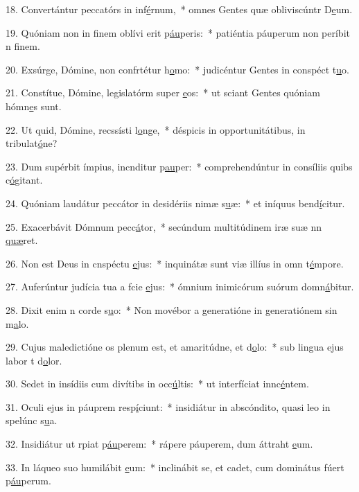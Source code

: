 18. Convertántur peccatórs in inf\uline{é}rnum,~* omnes Gentes quæ obliviscúntr D\uline{e}um.\par 
19. Quóniam non in finem oblívi erit p\uline{áu}peris:~* patiéntia páuperum non períbit n f\uline{i}nem.\par 
20. Exsúrge, Dómine, non confrtétur h\uline{o}mo:~* judicéntur Gentes in conspéct t\uline{u}o.\par 
21. Constítue, Dómine, legislatórm super \uline{e}os:~* ut sciant Gentes quóniam hómn\uline{e}s sunt.\par 
22. Ut quid, Dómine, recssísti l\uline{o}nge,~* déspicis in opportunitátibus, in tribulat\uline{ó}ne?\par 
23. Dum supérbit ímpius, incnditur p\uline{au}per:~* comprehendúntur in consíliis quibs c\uline{ó}gitant.\par 
24. Quóniam laudátur peccátor in desidériis nimæ s\uline{u}æ:~* et iníquus bend\uline{í}citur.\par 
25. Exacerbávit Dómnum pecc\uline{á}tor,~* secúndum multitúdinem iræ suæ nn \uline{quæ}ret.\par 
26. Non est Deus in cnspéctu \uline{e}jus:~* inquinátæ sunt viæ illíus in omn t\uline{é}mpore.\par 
27. Auferúntur judícia tua a fcie \uline{e}jus:~* ómnium inimicórum suórum domn\uline{á}bitur.\par 
28. Dixit enim n corde s\uline{u}o:~* Non movébor a generatióne in generatiónem sin m\uline{a}lo.\par 
29. Cujus maledictióne os plenum est, et amaritúdne, et d\uline{o}lo:~* sub lingua ejus labor t d\uline{o}lor.\par 
30. Sedet in insídiis cum divítibs in occ\uline{ú}ltis:~* ut interfíciat innc\uline{é}ntem.\par 
31. Oculi ejus in páuprem resp\uline{í}ciunt:~* insidiátur in abscóndito, quasi leo in spelúnc s\uline{u}a.\par 
32. Insidiátur ut rpiat p\uline{áu}perem:~* rápere páuperem, dum áttraht \uline{e}um.\par 
33. In láqueo suo humilábit \uline{e}um:~* inclinábit se, et cadet, cum dominátus fúert p\uline{áu}perum.\par 
